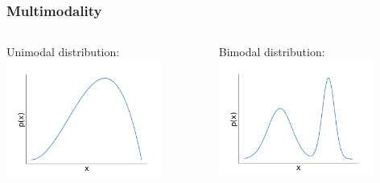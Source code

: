 \documentclass[t,aspectratio=169]{beamer}
\begin{document}
\begin{frame}
  \frametitle{Multimodality}
  \begin{columns}
    \begin{column}{0.48\textwidth}
      Unimodal distribution:
      \includegraphics[width=0.8\textwidth]{images/unimodal}
    \end{column}
    \begin{column}{0.48\textwidth}
      Bimodal distribution:
      \includegraphics[width=0.8\textwidth]{images/bimodal}
    \end{column}
  \end{columns}
\end{frame}
\end{document}
